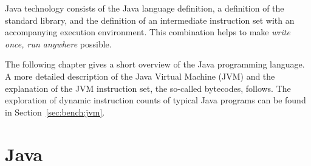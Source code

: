 Java technology consists of the Java language definition, a
definition of the standard library, and the definition of an
intermediate instruction set with an accompanying execution
environment. This combination helps to make \emph{write once, run
anywhere} possible.

The following chapter gives a short overview of the Java programming
language. A more detailed description of the Java Virtual Machine
(JVM) and the explanation of the JVM instruction set, the so-called
bytecodes, follows. The exploration of dynamic instruction counts of
typical Java programs can be found in Section~\ref{sec:bench:jvm}.

\section{Java}

